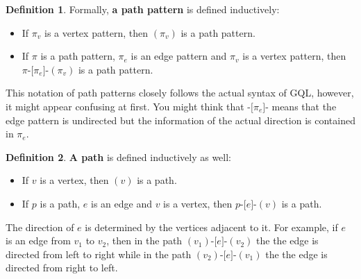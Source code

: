 \documentclass[14pt]{constructor-thesis}
\theoremstyle{definition}
\newtheorem*{definition}{Definition}
\begin{document}



\begin{definition}
  Formally, \textbf{a path pattern} is defined inductively:
  \begin{itemize}
    \item If $\pi_v$ is a vertex pattern, then $(\pi_v)$ is a path pattern.
    \item If $\pi$ is a path pattern, $\pi_e$ is an edge pattern and $\pi_v$ is a vertex pattern, then $\pi \texttt{-[} \pi_e \texttt{]-} (\pi_v)$ is a path pattern.
  \end{itemize}
\end{definition}

This notation of path patterns closely follows the actual syntax of GQL, however, it might appear confusing at first. You might think that $\texttt{-[} \pi_e \texttt{]-}$ means that the edge pattern is undirected but the information of the actual direction is contained in $\pi_e$.

\begin{definition}
  \textbf{A path} is defined inductively as well:
  \begin{itemize}
    \item If $v$ is a vertex, then $(v)$ is a path.
    \item If $p$ is a path, $e$ is an edge and $v$ is a vertex, then $p \texttt{-[} e \texttt{]-} (v)$ is a path.
  \end{itemize}
\end{definition}

The direction of $e$ is determined by the vertices adjacent to it. For example, if $e$ is an edge from $v_1$ to $v_2$, then in the path $(v_1) \texttt{-[} e \texttt{]-} (v_2)$ the the edge is directed from left to right while in the path $(v_2) \texttt{-[} e \texttt{]-} (v_1)$ the the edge is directed from right to left.
\end{document}
